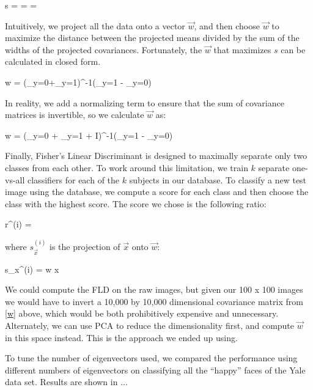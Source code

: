 \be
s = =  = 
\ee

\noindent Intuitively, we project all the data onto a vector $\vec w$,
and then choose $\vec w$ to maximize the distance between the
projected means divided by the sum of the widths of the projected
covariances.  Fortunately, the $\vec w$ that maximizes $s$ can be
calculated in closed form.

\be
\vec w = (\Sigma_{y=0}+\Sigma_{y=1})^{-1}(\vec \mu_{y=1} - \vec \mu_{y=0})
\ee

\noindent In reality, we add a normalizing term to ensure that the sum
of covariance matrices is invertible, so we calculate $\vec w$ as:

\be
\vec w = (\Sigma_{y=0} + \Sigma_{y=1} + \epsilon I)^{-1}(\vec \mu_{y=1} - \vec \mu_{y=0})
\ee

Finally, Fisher's Linear Discriminant is designed to maximally
separate only two classes from each other.  To work around this
limitation, we train $k$ separate one-vs-all classifiers for each of
the $k$ subjects in our database.  To classify a new test image using
the database, we compute a score for each class and then choose the
class with the highest score.  The score we chose is the following
ratio:

\be
r^{(i)} = 
\ee


\noindent where $s_{\vec x}^{(i)}$ is the projection of $\vec x$ onto $\vec w$:

\be
s_{\vec x}^{(i)} = \vec w \cdot \vec x
\ee

We could compute the FLD on the raw images, but given our 100 x 100
images we would have to invert a 10,000 by 10,000 dimensional
covariance matrix from \eqref{w} above, which would be both
prohibitively expensive and unnecessary.  Alternately, we can use PCA
to reduce the dimensionality first, and compute $\vec w$ in this space
instead.  This is the approach we ended up using.

To tune the number of eigenvectors used, we compared the performance
using different numbers of eigenvectors on classifying all the
``happy'' faces of the Yale data set.  Results are shown in
...





